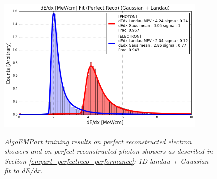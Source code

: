 \begin{figure}[ht!]
\centering
\includegraphics[width=0.9\textwidth]{Figures/EMPartTraining/mc_trained/dEdx_Selected_both.png}\\
\caption{\textit{AlgoEMPart training results on perfect reconstructed electron showers and on perfect reconstructed photon showers as described in Section \ref{empart_perfectreco_performance}: 1D landau + Gaussian fit to dE/dx.}}
\label{empart_perfectreco_performance_fig2}
\end{figure}


